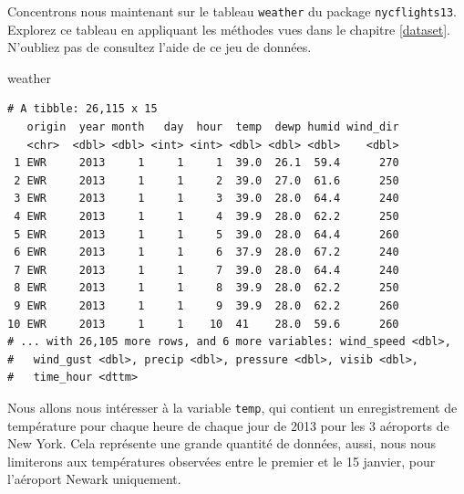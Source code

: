 \documentclass[a4paperpaper,]{article}
\newenvironment{Shaded}{\begin{snugshade}}{\end{snugshade}}
\newcommand{\DecValTok}[1]{\textcolor[rgb]{0.69,0.50,0.00}{#1}}
\newcommand{\KeywordTok}[1]{\textcolor[rgb]{0.12,0.11,0.11}{\textbf{#1}}}
\newcommand{\NormalTok}[1]{\textcolor[rgb]{0.12,0.11,0.11}{#1}}
\newcommand{\OperatorTok}[1]{\textcolor[rgb]{0.12,0.11,0.11}{#1}}
\newcommand{\StringTok}[1]{\textcolor[rgb]{0.75,0.01,0.01}{#1}}
\begin{document}
Concentrons nous maintenant sur le tableau \texttt{weather} du package \texttt{nycflights13}. Explorez ce tableau en appliquant les méthodes vues dans le chapitre \ref{dataset}. N'oubliez pas de consultez l'aide de ce jeu de données.

\begin{Shaded}
\begin{Highlighting}[]
\NormalTok{weather}
\end{Highlighting}
\end{Shaded}

\begin{verbatim}
# A tibble: 26,115 x 15
   origin  year month   day  hour  temp  dewp humid wind_dir
   <chr>  <dbl> <dbl> <int> <int> <dbl> <dbl> <dbl>    <dbl>
 1 EWR     2013     1     1     1  39.0  26.1  59.4      270
 2 EWR     2013     1     1     2  39.0  27.0  61.6      250
 3 EWR     2013     1     1     3  39.0  28.0  64.4      240
 4 EWR     2013     1     1     4  39.9  28.0  62.2      250
 5 EWR     2013     1     1     5  39.0  28.0  64.4      260
 6 EWR     2013     1     1     6  37.9  28.0  67.2      240
 7 EWR     2013     1     1     7  39.0  28.0  64.4      240
 8 EWR     2013     1     1     8  39.9  28.0  62.2      250
 9 EWR     2013     1     1     9  39.9  28.0  62.2      260
10 EWR     2013     1     1    10  41    28.0  59.6      260
# ... with 26,105 more rows, and 6 more variables: wind_speed <dbl>,
#   wind_gust <dbl>, precip <dbl>, pressure <dbl>, visib <dbl>,
#   time_hour <dttm>
\end{verbatim}

Nous allons nous intéresser à la variable \texttt{temp}, qui contient un enregistrement de température pour chaque heure de chaque jour de 2013 pour les 3 aéroports de New York. Cela représente une grande quantité de données, aussi, nous nous limiterons aux températures observées entre le premier et le 15 janvier, pour l'aéroport Newark uniquement.

\begin{Shaded}
\end{Shaded}
\end{document}

